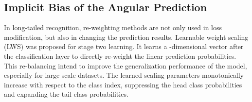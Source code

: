\documentclass[10pt,twocolumn,letterpaper]{article}
\begin{document}
\subsection{Implicit Bias of the Angular Prediction}
In long-tailed recognition, re-weighting methods are not only used in loss modification, but also in changing the prediction results. Learnable weight scaling (LWS) \cite{decoupling} was proposed for stage two learning. It learns a -dimensional vector after the classification layer to directly re-weight the linear prediction probabilities. This re-balancing intend to improve the generalization performance of the model, especially for large scale datasets. The learned scaling parameters monotonically increase with respect to the class index, suppressing the head class probabilities and  expanding the tail class probabilities. 
\end{document}
